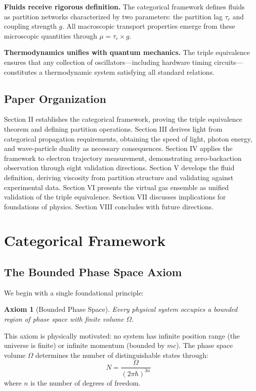 \documentclass[aps,prl,twocolumn,superscriptaddress,floatfix]{revtex4-2}
\newtheorem{axiom}{Axiom}
\begin{document}
\textbf{Fluids receive rigorous definition.} The categorical framework defines fluids as partition networks characterized by two parameters: the partition lag $\tau_c$ and coupling strength $g$. All macroscopic transport properties emerge from these microscopic quantities through $\mu = \tau_c \times g$.

\textbf{Thermodynamics unifies with quantum mechanics.} The triple equivalence ensures that any collection of oscillators---including hardware timing circuits---constitutes a thermodynamic system satisfying all standard relations.

\subsection{Paper Organization}

Section II establishes the categorical framework, proving the triple equivalence theorem and defining partition operations. Section III derives light from categorical propagation requirements, obtaining the speed of light, photon energy, and wave-particle duality as necessary consequences. Section IV applies the framework to electron trajectory measurement, demonstrating zero-backaction observation through eight validation directions. Section V develops the fluid definition, deriving viscosity from partition structure and validating against experimental data. Section VI presents the virtual gas ensemble as unified validation of the triple equivalence. Section VII discusses implications for foundations of physics. Section VIII concludes with future directions.

\section{Categorical Framework}

\subsection{The Bounded Phase Space Axiom}

We begin with a single foundational principle:

\begin{axiom}[Bounded Phase Space]
Every physical system occupies a bounded region of phase space with finite volume $\Omega$.
\end{axiom}

This axiom is physically motivated: no system has infinite position range (the universe is finite) or infinite momentum (bounded by $mc$). The phase space volume $\Omega$ determines the number of distinguishable states through:
\begin{equation}
N = \frac{\Omega}{(2\pi\hbar)^{3n}}
\end{equation}
where $n$ is the number of degrees of freedom.
\end{document}
